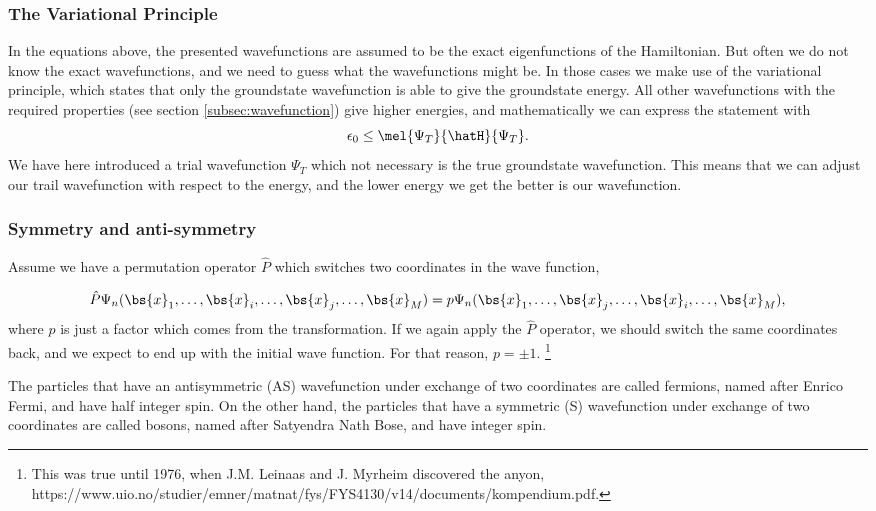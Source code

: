\subsubsection{The Variational Principle}
In the equations above, the presented wavefunctions are assumed to be the exact eigenfunctions of the Hamiltonian. But often we do not know the exact wavefunctions, and we need to guess what the wavefunctions might be. In those cases we make use of the variational principle, which states that only the groundstate wavefunction is able to give the groundstate energy. All other wavefunctions with the required properties (see section \ref{subsec:wavefunction}) give higher energies, and mathematically we can express the statement with
\begin{equation}
\epsilon_0\leq\mel{\Psi_T}{\hatH}{\Psi_T}.
\end{equation}
We have here introduced a trial wavefunction $\Psi_T$ which not necessary is the true groundstate wavefunction. This means that we can adjust our trail wavefunction with respect to the energy, and the lower energy we get the better is our wavefunction. 

\subsubsection{Symmetry and anti-symmetry} \label{subsubsec:symmetry}
Assume we have a permutation operator $\hat{P}$ which switches two coordinates in the wave function,

\begin{equation}
\hat{P}\Psi_n(\bs{x}_1,\hdots,\bs{x}_i,\hdots,\bs{x}_j,\hdots,\bs{x}_M)=p\Psi_n(\bs{x}_1,\hdots,\bs{x}_j,\hdots,\bs{x}_i,\hdots,\bs{x}_M),
\end{equation}
where $p$ is just a factor which comes from the transformation. If we again apply the $\hat{P}$ operator, we should switch the same coordinates back, and we expect to end up with the initial wave function. For that reason, $p=\pm1$. \footnote{This was true until 1976, when J.M. Leinaas and J. Myrheim discovered the anyon, https://www.uio.no/studier/emner/matnat/fys/FYS4130/v14/documents/kompendium.pdf.}

The particles that have an antisymmetric (AS) wavefunction under exchange of two coordinates are called fermions, named after Enrico Fermi, and have half integer spin. On the other hand, the particles that have a symmetric (S) wavefunction under exchange of two coordinates are called bosons, named after Satyendra Nath Bose, and have integer spin. 

